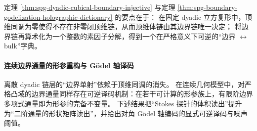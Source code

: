 \begin{remark}[离散全息字典的链层刚性]\label{rem:spg-dyadic-holography-chain-level}
定理 \ref{thm:spg-dyadic-cubical-boundary-injective} 与定理 \ref{thm:spg-boundary-godelization-holographic-dictionary} 的要点在于：
在固定 dyadic 立方复形中，顶维同调为零使得不存在非零闭顶维链，从而顶维体链由其边界链唯一决定；
将边界链再算术化为一个整数的素因子分解，得到一个在严格意义下可逆的“边界 \(\leftrightarrow\) bulk”字典。
\end{remark}





\paragraph{连续边界通量的形参重构与 Gödel 轴译码}
离散 dyadic 链层的“边界单射”依赖于顶维同调的消失。
在连续几何模型中，对严格凸域的边界通量同样存在可逆译码机制：在若干可计算的形参族上，有限阶边界多项式通量即为形参的完备不变量。
下述结果把“Stokes 探针的体积读出”提升为“二阶通量的形状矩阵读出”，并给出对角 Gödel 轴编码的显式可逆译码与噪声阈值。

